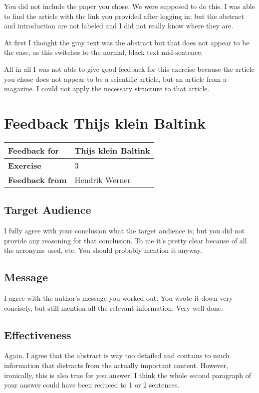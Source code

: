 \documentclass[12pt, a4paper]{article}
\begin{document}
You did not include the paper you chose. We were supposed to do this. I was able to find the article with the link you provided after logging in; but the abstract and introduction are not labeled and I did not really know where they are.

At first I thought the gray text was the abstract but that does not appear to be the case, as this switches to the normal, black text mid-sentence.

All in all I was not able to give good feedback for this exercise because the article you chose does not appear to be a scientific article, but an article from a magazine. I could not apply the necessary structure to that article.

\clearpage
\section{Feedback Thijs klein Baltink}
\begin{tabular}{|l|l|}
	\hline
	\textbf{Feedback for} & Thijs klein Baltink\\\hline
	\textbf{Exercise} & 3\\\hline
	\textbf{Feedback from} & Hendrik Werner\\\hline
\end{tabular}

\subsection{Target Audience}
I fully agree with your conclusion what the target audience is; but you did not provide any reasoning for that conclusion. To me it's pretty clear because of all the acronyms used, etc. You should probably mention it anyway.

\subsection{Message}
I agree with the author's message you worked out. You wrote it down very concisely, but still mention all the relevant information. Very well done.

\subsection{Effectiveness}
Again, I agree that the abstract is way too detailed and contains to much information that distracts from the actually important content. However, ironically, this is also true for you answer. I think the whole second paragraph of your answer could have been reduced to 1 or 2 sentences.
\end{document}
